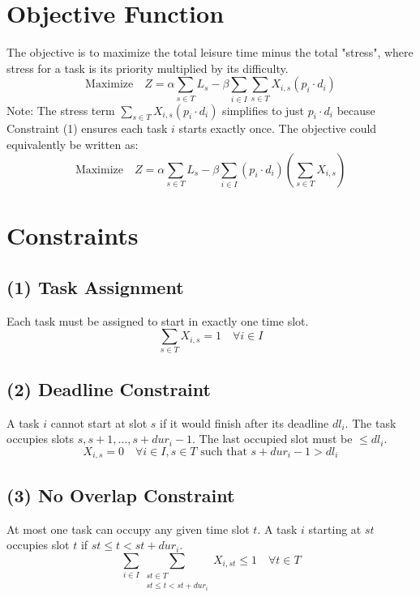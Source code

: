 \documentclass{article}
\begin{document}
\section{Objective Function}
The objective is to maximize the total leisure time minus the total "stress", where stress for a task is its priority multiplied by its difficulty.
\[
\text{Maximize} \quad Z = \alpha \sum_{s \in T} L_s - \beta \sum_{i \in I} \sum_{s \in T} X_{i,s} (p_i \cdot d_i)
\]
Note: The stress term $\sum_{s \in T} X_{i,s} (p_i \cdot d_i)$ simplifies to just $p_i \cdot d_i$ because Constraint (1) ensures each task $i$ starts exactly once. The objective could equivalently be written as:
\[
\text{Maximize} \quad Z = \alpha \sum_{s \in T} L_s - \beta \sum_{i \in I} (p_i \cdot d_i) \left( \sum_{s \in T} X_{i,s} \right)
\]

\section{Constraints}

\subsection{(1) Task Assignment}
Each task must be assigned to start in exactly one time slot.
\[
\sum_{s \in T} X_{i,s} = 1 \quad \forall i \in I
\]

\subsection{(2) Deadline Constraint}
A task $i$ cannot start at slot $s$ if it would finish after its deadline $dl_i$. The task occupies slots $s, s+1, \dots, s + dur_i - 1$. The last occupied slot must be $\le dl_i$.
\[
X_{i,s} = 0 \quad \forall i \in I, s \in T \text{ such that } s + dur_i - 1 > dl_i
\]

\subsection{(3) No Overlap Constraint}
At most one task can occupy any given time slot $t$. A task $i$ starting at $st$ occupies slot $t$ if $st \le t < st + dur_i$.
\[
\sum_{i \in I} \sum_{\substack{st \in T \\ st \le t < st + dur_i}} X_{i, st} \le 1 \quad \forall t \in T
\]
\end{document}

